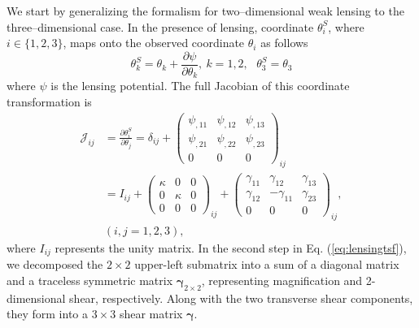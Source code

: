 We start by generalizing the formalism for two--dimensional weak lensing \cite{Weinberg201387} to the three--dimensional case.
In the presence of lensing, coordinate $\theta_i^S$, where $i\in\{1,2,3\}$, maps onto the observed coordinate $\theta_i$ as follows \begin{equation}
\theta_k^S=\theta_k+\frac{\partial\psi}{\partial\theta_k},\ k=1,2,\ \ \ \theta_3^S=\theta_3
\label{eq:lensingmapping}
\end{equation}
where $\psi$ is the lensing potential. The full Jacobian of this coordinate transformation is
\begin{align}
\mathcal{J}_{ij}&=\frac{\partial\theta_i^S}{\partial\theta_j}=\delta_{ij}+\left(\begin{array}{ccc}
\psi_{,11} & \psi_{,12} & \psi_{,13}\\
\psi_{,21} & \psi_{,22} & \psi_{,23}\\
0&0&0
\end{array}\right)_{ij} \nonumber\\
&= I_{ij} + \left(\begin{array}{ccc}
\kappa & 0 & 0\\
0 & \kappa & 0\\
0&0&0
\end{array}\right)_{ij}+\left(\begin{array}{ccc}
\gamma_{11} & \gamma_{12} & \gamma_{13}\\
\gamma_{12} & -\gamma_{11} & \gamma_{23}\\
0&0&0
\end{array}\right)_{ij},\nonumber\\
&(i,j=1,2,3),
\label{eq:lensingtsf}
\end{align}
where $I_{ij}$ represents the unity matrix. In the second step in Eq. (\ref{eq:lensingtsf}), we decomposed the $2\times 2$ upper-left submatrix into a sum of a diagonal matrix and a traceless symmetric matrix $\bm{\gamma}_{2\times 2}$, representing magnification and 2-dimensional shear, respectively. Along with the two transverse shear components, they form into a $3\times 3$ shear matrix $\bm{\gamma}$.

